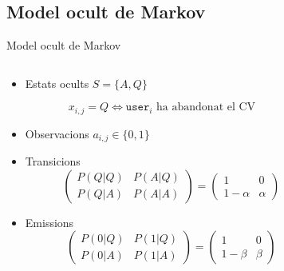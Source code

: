 \documentclass[xcolor=x11names,
								compress,
								aspectratio=1610]{beamer}
\newcommand{\mt}[1]{\texttt{#1}}
\theoremstyle{definition}%
\renewcommand{\(}{\begin{columns}}
\renewcommand{\)}{\end{columns}}
\newcommand{\<}[1]{\begin{column}{#1}}
\renewcommand{\>}{\end{column}}
\begin{document}
\subsection{Model ocult de Markov}
\begin{frame}{Model ocult de Markov}
	\begin{columns}[onlytextwidth]
		\begin{column}{.5\textwidth}
			\begin{itemize}
			\item Estats ocults $S = \{A,Q\}$
			\end{itemize}
			$$
			x_{i,j} = Q \Leftrightarrow \mt{user}_i \text{ ha abandonat el CV}
			$$
			\begin{itemize}
			\item Observacions $a_{i,j} \in \{0,1\}$
			\item Transicions
			$$
      \begin{pmatrix}
      P(Q|Q) & P(A|Q) \\
      P(Q|A) & P(A|A)
      \end{pmatrix}
      =
      \begin{pmatrix}
      1 & 0 \\
      1- \alpha & \alpha
      \end{pmatrix}
      $$
			\item Emissions
			$$
      \begin{pmatrix}
      P(0|Q) & P(1|Q) \\
      P(0|A) & P(1|A)
      \end{pmatrix}
      =
      \begin{pmatrix}
      1 & 0 \\
      1 - \beta & \beta
      \end{pmatrix}
      $$
			\end{itemize}
		\end{column}
		\begin{column}{.5\textwidth}
		\begin{center}
\end{center}
\end{column}
\end{columns}
\end{frame}
\end{document}
